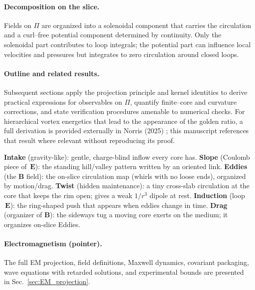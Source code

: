 \paragraph{Decomposition on the slice.}
Fields on $\Pi$ are organized into a solenoidal component that carries the circulation and a curl–free potential component determined by continuity. Only the solenoidal part contributes to loop integrals; the potential part can influence local velocities and pressures but integrates to zero circulation around closed loops.

\paragraph{Outline and related results.}
Subsequent sections apply the projection principle and kernel identities to derive practical expressions for observables on $\Pi$, quantify finite–core and curvature corrections, and state verification procedures amenable to numerical checks. For hierarchical vortex energetics that lead to the appearance of the golden ratio, a full derivation is provided externally in Norris (2025) \cite{Norris2025GoldenRatio}; this manuscript references that result where relevant without reproducing its proof.

\begin{tcolorbox}[title=Terminology spine (plain language)]
\textbf{Intake} (gravity-like): gentle, charge-blind inflow every core has.
\textbf{Slope} (Coulomb piece of $\,\mathbf E$): the standing hill/valley pattern written by an oriented link.
\textbf{Eddies} (the $\mathbf B$ field): the on-slice circulation map (whirls with no loose ends), organized by motion/drag.
\textbf{Twist} (hidden maintenance): a tiny cross-slab circulation at the core that keeps the rim open; gives a weak $1/r^3$ dipole at rest.
\textbf{Induction} (loop $\,\mathbf E$): the ring-shaped push that appears when eddies change in time.
\textbf{Drag} (organizer of $\mathbf B$): the sideways tug a moving core exerts on the medium; it organizes on-slice Eddies.
\end{tcolorbox}

\paragraph{Electromagnetism (pointer).}
The full EM projection, field definitions, Maxwell dynamics, covariant packaging, wave equations with retarded solutions, and experimental bounds are presented in Sec.~\ref{sec:EM_projection}.

